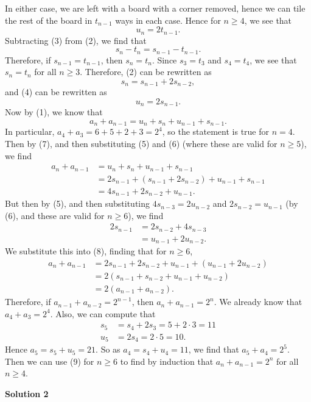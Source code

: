 \begin{enumerate}
 In either case, we are left with a board with a corner removed, hence we can tile the rest of the board in $t_{n-1}$  ways in each case. Hence for $n\ge 4$, we see that
 \[u_n=2t_{n-1}\tag{4}.\]Subtracting (3) from (2), we find that
 \[s_n-t_n=s_{n-1}-t_{n-1}.\]Therefore, if $s_{n-1}=t_{n-1}$, then $s_n=t_n$. Since $s_3=t_3$ and $s_4=t_4$, we see that $s_n=t_n$ for all $n\ge 3$. Therefore, (2) can be rewritten as
 \[s_n=s_{n-1}+2s_{n-2}\tag{5},\]and (4) can be rewritten as
 \[u_n=2s_{n-1}\tag{6}.\]Now by (1), we know that
 \[a_{n}+a_{n-1}=u_n+s_n+u_{n-1}+s_{n-1}.\tag{7}\]In particular, $a_4+a_3=6+5+2+3=2^4$, so the statement is true for $n=4$. Then by (7), and then substituting (5) and (6) (where these are valid for $n\ge 5$), we find
 \begin{align*} a_n+a_{n-1}&=u_n+s_n+u_{n-1}+s_{n-1}\\ &=2s_{n-1}+(s_{n-1}+2s_{n-2})+u_{n-1}+s_{n-1}\\ &=4s_{n-1}+2s_{n-2}+u_{n-1}.\tag{8} \end{align*}
But then by (5), and then substituting $4s_{n-3}=2u_{n-2}$ and $2s_{n-2}=u_{n-1}$ (by (6), and these are valid for $n\ge 6$), we find
 \begin{align*} 2s_{n-1}&=2s_{n-2}+4s_{n-3}\\ &=u_{n-1}+2u_{n-2}. \end{align*}
We substitute this into (8), finding that for $n\ge 6$,
 \begin{align*} a_{n}+a_{n-1}&=2s_{n-1}+2s_{n-2}+u_{n-1}+(u_{n-1}+2u_{n-2})\\ &=2(s_{n-1}+s_{n-2}+u_{n-1}+u_{n-2})\\ &=2(a_{n-1}+a_{n-2}).\tag{9} \end{align*}
Therefore, if $a_{n-1}+a_{n-2}=2^{n-1}$, then $a_{n}+a_{n-1}=2^n$. We already know that $a_4+a_3=2^4$. Also, we can compute that 
 \begin{align*} s_5&=s_4+2s_3=5+2\cdot 3=11\\ u_5&=2s_4=2\cdot 5=10. \end{align*}
Hence $a_5=s_5+u_5=21$. So as $a_4=s_4+u_4=11$, we find that $a_5+a_4=2^5$. Then we can use (9) for $n\ge 6$ to find by induction that $a_{n}+a_{n-1}=2^n$ for all $n\ge 4$.

 



\textbf{Solution 2}


\end{enumerate}
